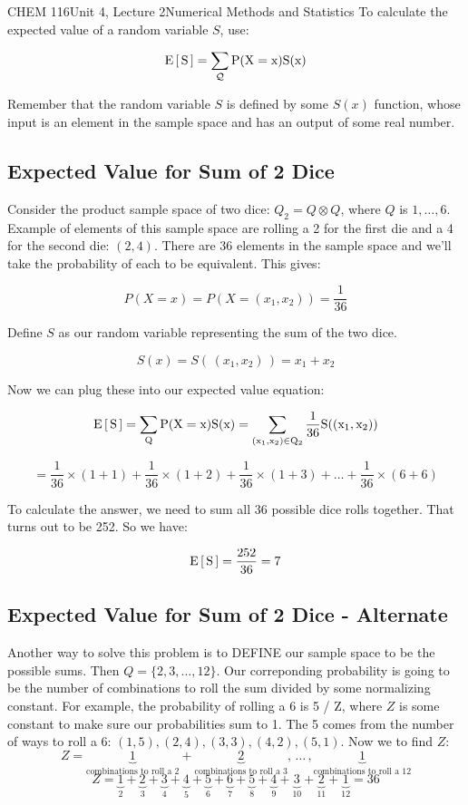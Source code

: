 \documentclass{article}
\begin{document}
\begin{tdoc}{CHEM 116}{Unit 4, Lecture 2}{Numerical Methods and Statistics}
To calculate the expected value of a random variable $S$, use:

\begin{equation}
\rm{E}\left[\,S\,\right] = \sum_\mathcal{Q} P(X=x)S(x)
\end{equation}

Remember that the random variable $S$ is defined by some $S(x)$
function, whose input is an element in the sample space and has an
output of some real number.


\subsection{Expected Value for Sum of 2 Dice}

Consider the product sample space of two dice: $Q_2 = Q \otimes Q$,
where $Q$ is $1,\ldots,6$. Example of elements of this sample space
are rolling a 2 for the first die and a 4 for the second die: $(2,
4)$. There are 36 elements in the sample space and we'll take the
probability of each to be equivalent. This gives:

\[
P(X = x) = P(X = (x_1, x_2)) = \frac{1}{36}
\]

Define $S$ as our random variable representing the sum of the two dice.

\[
S(x) = S(\, (x_1, x_2)\, ) = x_1 + x_2
\]

Now we can plug these into our expected value equation:

\[
\rm{E}\left[\,S\,\right] = \sum_{Q} P(X=x)S(x) = \sum_{(x_1,x_2) \in Q_2} \frac{1}{36} S( (x_1, x_2) )
\]

\[
= \frac{1}{36}\times (1 + 1) + \frac{1}{36} \times (1 + 2) + \frac{1}{36} \times (1 + 3) + \ldots + \frac{1}{36} \times (6 + 6)
\]

To calculate the answer, we need to sum all 36 possible dice rolls
together. That turns out to be 252. So we have:

\[
\rm{E}\left[\,S\,\right] = \frac{252}{36} = 7
\]

\subsection{Expected Value for Sum of 2 Dice - Alternate}

Another way to solve this problem is to DEFINE our sample space to be
the possible sums. Then $Q = \{2, 3, \ldots, 12\}$. Our correponding
probability is going to be the number of combinations to roll the sum
divided by some normalizing constant. For example, the probability of
rolling a 6 is 5 / Z, where $Z$ is some constant to make sure our
probabilities sum to 1. The 5 comes from the number of ways to roll a
6: $(1, 5), (2, 4), (3, 3), (4, 2), (5, 1)$. Now we to find $Z$:
\[
Z = \underbrace{1}_{\textrm{combinations to roll a 2}} + \underbrace{2}_{\textrm{combinations to roll a 3}},\, \ldots\,, \underbrace{1}_{\textrm{combinations to roll a 12}}
\]
\[
Z = \underbrace{1}_2 + \underbrace{2}_3 + \underbrace{3}_4 + \underbrace{4}_5 + \underbrace{5}_6 + \underbrace{6}_7 + \underbrace{5}_8 + \underbrace{4}_9 + \underbrace{3}_{10} + \underbrace{2}_{11} + \underbrace{1}_{12} = 36
\]


\end{tdoc}
\end{document}
